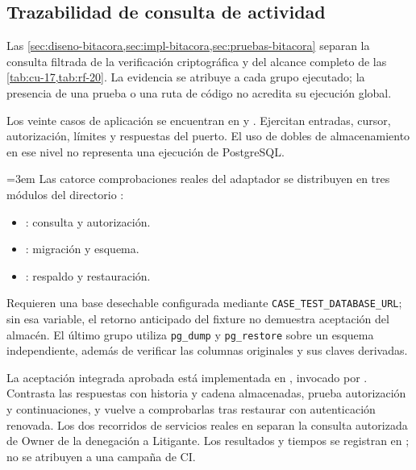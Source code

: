 \subsection{Trazabilidad de consulta de actividad}\label{anexo:bitacora}
Las \cref{sec:diseno-bitacora,sec:impl-bitacora,sec:pruebas-bitacora} separan
la consulta filtrada de la verificación criptográfica y del alcance completo
de las \cref{tab:cu-17,tab:rf-20}. La evidencia se atribuye a cada grupo ejecutado;
la presencia de una prueba o una ruta de código no acredita su ejecución global.

Los veinte casos de aplicación se encuentran en
 y
. Ejercitan entradas,
cursor, autorización, límites y respuestas del puerto. El uso de dobles de
almacenamiento en ese nivel no representa una ejecución de PostgreSQL.

{\emergencystretch=3em Las catorce comprobaciones reales del adaptador se distribuyen en tres módulos
del directorio :
\begin{itemize}
  \item {}: consulta y autorización.
  \item {}: migración y esquema.
  \item {}: respaldo y restauración.
\end{itemize}
Requieren una base
desechable configurada mediante \texttt{CASE\_TEST\_DATABASE\_URL}; sin esa
variable, el retorno anticipado del fixture no demuestra aceptación del almacén.
El último grupo utiliza \texttt{pg\_dump} y \texttt{pg\_restore} sobre un esquema
independiente, además de verificar las columnas originales y sus claves derivadas.\par}

La aceptación integrada aprobada está implementada en
, invocado por
. Contrasta las respuestas con historia y cadena
almacenadas, prueba autorización y continuaciones, y vuelve a comprobarlas tras
restaurar con autenticación renovada. Los dos recorridos de servicios reales en
 separan la consulta autorizada de
Owner de la denegación a Litigante. Los resultados y tiempos se registran en
; no se atribuyen a una campaña de CI.

